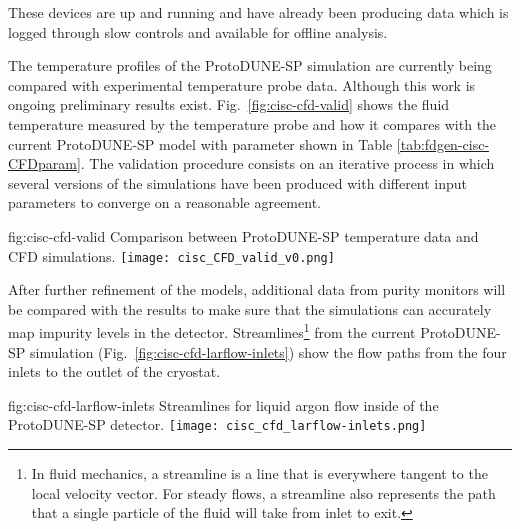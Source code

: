 These devices are up and running and have already been producing data which is logged through slow controls and available for offline analysis.

The temperature profiles of the ProtoDUNE-SP simulation are currently being compared with experimental temperature probe data. Although this work is ongoing preliminary results exist. Fig.~\ref{fig:cisc-cfd-valid} shows the fluid temperature measured by the temperature probe and how it compares with the current ProtoDUNE-SP  model with parameter shown in Table \ref{tab:fdgen-cisc-CFDparam}. 
The validation procedure consists on an iterative process in which several versions of the  simulations have been produced with different input parameters to converge on a reasonable agreement. 

\begin{dunefigure}{fig:cisc-cfd-valid}
  {Comparison between ProtoDUNE-SP temperature data and CFD simulations.}
  \texttt{[image: cisc\_CFD\_valid\_v0.png]}
\end{dunefigure}

After further refinement of the  models, additional data from purity monitors will be compared with the results to make sure that the simulations can accurately map impurity levels in the detector. Streamlines\footnote{In fluid mechanics, a streamline is a line that is everywhere tangent to the local velocity vector. For steady flows, a streamline also represents the path that a single particle of the fluid will take from inlet to exit.} from the current ProtoDUNE-SP simulation (Fig.~\ref{fig:cisc-cfd-larflow-inlets}) show the flow paths from the four inlets to the outlet of the cryostat.

\begin{dunefigure}{fig:cisc-cfd-larflow-inlets}
  {Streamlines for liquid argon flow inside of the ProtoDUNE-SP detector.}
  \texttt{[image: cisc\_cfd\_larflow-inlets.png]}
\end{dunefigure}

